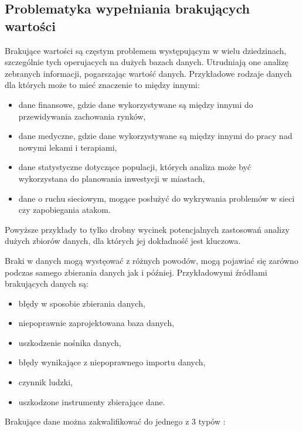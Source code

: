 \documentclass[12pt,twoside]{article}
\begin{document}
\subsection{Problematyka wypełniania brakujących wartości}

Brakujące wartości są częstym problemem występującym w wielu dziedzinach,
szczególnie tych operujacych na dużych bazach danych. Utrudniają one analizę zebranych informacji,
pogarszając wartość danych. Przykładowe rodzaje danych dla których może to mieć znaczenie to między innymi:

\begin{itemize}[label=-,labelsep=0.4cm, leftmargin=1.25cm]
    \item dane finansowe, gdzie dane wykorzystywane są między innymi do przewidywania zachowania rynków, \cite{fin}
    \item dane medyczne, gdzie dane wykorzystywane są między innymi do pracy nad nowymi lekami i terapiami, \cite{med}
    \item dane statystyczne dotyczące populacji, których analiza może być wykorzystana
          do planowania inwestycji w miastach, \cite{pop}
    \item dane o ruchu sieciowym, mogące posłużyć do wykrywania problemów w sieci czy zapobiegania atakom. \cite{net}
\end{itemize}

Powyższe przykłady to tylko drobny wycinek potencjalnych zastosowań analizy dużych zbiorów danych,
dla których jej dokładność jest kluczowa.

Braki w danych mogą wystęować z różnych powodów, mogą pojawiać się zarówno podczas samego zbierania danych jak i później.
Przykładowymi źródłami brakujących danych są:

\begin{itemize}[label=-,labelsep=0.4cm, leftmargin=1.25cm]
    \item błędy w sposobie zbierania danych,
    \item niepoprawnie zaprojektowana baza danych,
    \item uszkodzenie nośnika danych,
    \item błędy wynikające z niepoprawnego importu danych,
    \item czynnik ludzki,
    \item uszkodzone instrumenty zbierające dane.
\end{itemize}

Brakujące dane można zakwalifikować do jednego z 3 typów \cite{types}:
\end{document}
